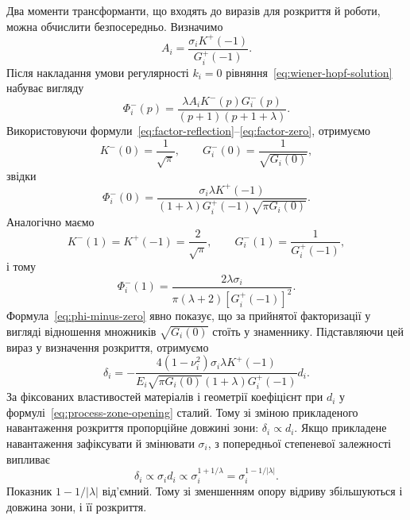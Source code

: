 Два моменти трансформанти, що входять до виразів для розкриття й роботи, можна обчислити безпосередньо. Визначимо
\begin{equation*}
  A_i=\frac{\sigma_iK^+(-1)}{G_i^+(-1)}.
\end{equation*}
Після накладання умови регулярності $k_i=0$ рівняння~\eqref{eq:wiener-hopf-solution} набуває вигляду
\begin{equation}
\label{eq:phi-minus-regular}
  \Phi_i^-(p)=
  \frac{\lambda A_i K^-(p)G_i^-(p)}
  {(p+1)(p+1+\lambda)}.
\end{equation}
Використовуючи формули~\eqref{eq:factor-reflection}--\eqref{eq:factor-zero}, отримуємо
\begin{equation*}
  K^-(0)=\frac{1}{\sqrt{\pi}},\qquad
  G_i^-(0)=\frac{1}{\sqrt{G_i(0)}},
\end{equation*}
звідки
\begin{equation}
\label{eq:phi-minus-zero}
  \Phi_i^-(0)=
  \frac{\sigma_i\lambda K^+(-1)}
  {(1+\lambda)G_i^+(-1)\sqrt{\pi G_i(0)}}.
\end{equation}
Аналогічно маємо
\begin{equation*}
  K^-(1)=K^+(-1)=\frac{2}{\sqrt{\pi}},\qquad
  G_i^-(1)=\frac{1}{G_i^+(-1)},
\end{equation*}
і тому
\begin{equation}
\label{eq:phi-minus-one}
  \Phi_i^-(1)=
  \frac{2\lambda\sigma_i}
  {\pi(\lambda+2)[G_i^+(-1)]^2}.
\end{equation}
Формула~\eqref{eq:phi-minus-zero} явно показує, що за прийнятої факторизації у вигляді відношення множників $\sqrt{G_i(0)}$ стоїть у знаменнику. Підставляючи цей вираз у визначення розкриття, отримуємо
\begin{equation}
\label{eq:process-zone-opening}
  \delta_i=
  -\frac{4(1-\nu_i^2)\sigma_i\lambda K^+(-1)}
  {E_i\sqrt{\pi G_i(0)}(1+\lambda)G_i^+(-1)}d_i.
\end{equation}
За фіксованих властивостей матеріалів і геометрії коефіцієнт при $d_i$ у формулі~\eqref{eq:process-zone-opening} сталий. Тому зі зміною прикладеного навантаження розкриття пропорційне довжині зони: $\delta_i\propto d_i$. Якщо прикладене навантаження зафіксувати й змінювати $\sigma_i$, з попередньої степеневої залежності випливає
\begin{equation*}
  \delta_i\propto \sigma_i d_i
  \propto \sigma_i^{1+1/\lambda}
  =\sigma_i^{1-1/|\lambda|}.
\end{equation*}
Показник $1-1/|\lambda|$ від’ємний. Тому зі зменшенням опору відриву збільшуються і довжина зони, і її розкриття.

